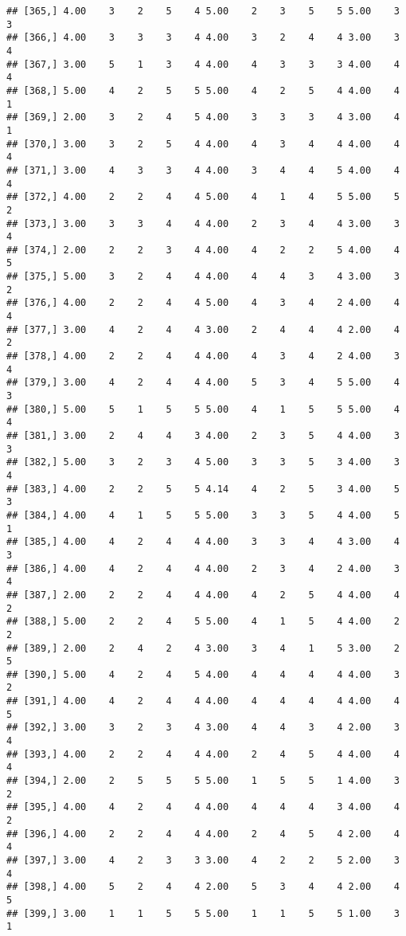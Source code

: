 \documentclass[]{article}
\begin{document}
\begin{verbatim}
## [365,] 4.00    3    2    5    4 5.00    2    3    5    5 5.00    3    3
## [366,] 4.00    3    3    3    4 4.00    3    2    4    4 3.00    3    4
## [367,] 3.00    5    1    3    4 4.00    4    3    3    3 4.00    4    4
## [368,] 5.00    4    2    5    5 5.00    4    2    5    4 4.00    4    1
## [369,] 2.00    3    2    4    5 4.00    3    3    3    4 3.00    4    1
## [370,] 3.00    3    2    5    4 4.00    4    3    4    4 4.00    4    4
## [371,] 3.00    4    3    3    4 4.00    3    4    4    5 4.00    4    4
## [372,] 4.00    2    2    4    4 5.00    4    1    4    5 5.00    5    2
## [373,] 3.00    3    3    4    4 4.00    2    3    4    4 3.00    3    4
## [374,] 2.00    2    2    3    4 4.00    4    2    2    5 4.00    4    5
## [375,] 5.00    3    2    4    4 4.00    4    4    3    4 3.00    3    2
## [376,] 4.00    2    2    4    4 5.00    4    3    4    2 4.00    4    4
## [377,] 3.00    4    2    4    4 3.00    2    4    4    4 2.00    4    2
## [378,] 4.00    2    2    4    4 4.00    4    3    4    2 4.00    3    4
## [379,] 3.00    4    2    4    4 4.00    5    3    4    5 5.00    4    3
## [380,] 5.00    5    1    5    5 5.00    4    1    5    5 5.00    4    4
## [381,] 3.00    2    4    4    3 4.00    2    3    5    4 4.00    3    3
## [382,] 5.00    3    2    3    4 5.00    3    3    5    3 4.00    3    4
## [383,] 4.00    2    2    5    5 4.14    4    2    5    3 4.00    5    3
## [384,] 4.00    4    1    5    5 5.00    3    3    5    4 4.00    5    1
## [385,] 4.00    4    2    4    4 4.00    3    3    4    4 3.00    4    3
## [386,] 4.00    4    2    4    4 4.00    2    3    4    2 4.00    3    4
## [387,] 2.00    2    2    4    4 4.00    4    2    5    4 4.00    4    2
## [388,] 5.00    2    2    4    5 5.00    4    1    5    4 4.00    2    2
## [389,] 2.00    2    4    2    4 3.00    3    4    1    5 3.00    2    5
## [390,] 5.00    4    2    4    5 4.00    4    4    4    4 4.00    3    2
## [391,] 4.00    4    2    4    4 4.00    4    4    4    4 4.00    4    5
## [392,] 3.00    3    2    3    4 3.00    4    4    3    4 2.00    3    4
## [393,] 4.00    2    2    4    4 4.00    2    4    5    4 4.00    4    4
## [394,] 2.00    2    5    5    5 5.00    1    5    5    1 4.00    3    2
## [395,] 4.00    4    2    4    4 4.00    4    4    4    3 4.00    4    2
## [396,] 4.00    2    2    4    4 4.00    2    4    5    4 2.00    4    4
## [397,] 3.00    4    2    3    3 3.00    4    2    2    5 2.00    3    4
## [398,] 4.00    5    2    4    4 2.00    5    3    4    4 2.00    4    5
## [399,] 3.00    1    1    5    5 5.00    1    1    5    5 1.00    3    1

\end{verbatim}
\end{document}
